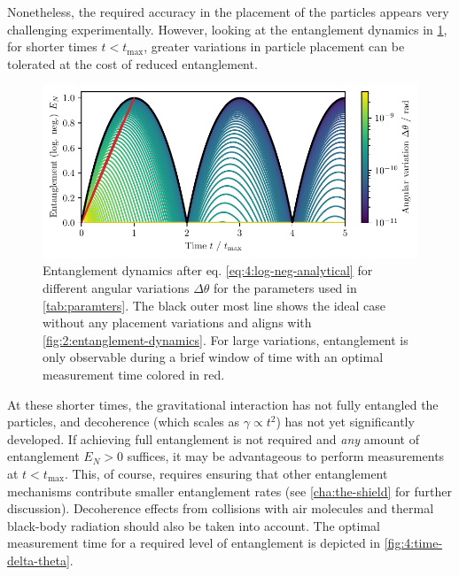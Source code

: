 Nonetheless, the required accuracy in the placement of the particles appears very challenging experimentally.
However, looking at the entanglement dynamics in \cref{fig:4:EN-dynamics-variations}, for shorter times $t<t_\mathrm{max}$, greater variations in particle placement can be tolerated at the cost of reduced entanglement.
\begin{figure}[!htbp]
  \centering
  \includegraphics[width=\textwidth]{./../figures/theta-variance/EN-dynamics-delta-theta.pdf}
  \caption{Entanglement dynamics after eq. \eqref{eq:4:log-neg-analytical} for different angular variations $\Delta \theta$ for the parameters used in \cref{tab:paramters}. The black outer most line shows the ideal case without any placement variations and aligns with \cref{fig:2:entanglement-dynamics}. For large variations, entanglement is only observable during a brief window of time with an optimal measurement time colored in red.}
  \label{fig:4:EN-dynamics-variations}
\end{figure}
At these shorter times, the gravitational interaction has not fully entangled the particles, and decoherence (which scales as $\gamma \propto t^2$) has not yet significantly developed.
If achieving full entanglement is not required and \textit{any} amount of entanglement $E_N > 0$ suffices, it may be advantageous to perform measurements at $t < t_\mathrm{max}$.
This, of course, requires ensuring that other entanglement mechanisms contribute smaller entanglement rates (see \cref{cha:the-shield} for further discussion).
Decoherence effects from collisions with air molecules and thermal black-body radiation should also be taken into account.
The optimal measurement time for a required level of entanglement is depicted in \cref{fig:4:time-delta-theta}.
